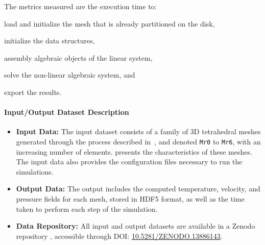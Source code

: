 The metrics measured are the execution time to:
\begin{inparaenum}[\it (i)]
    \item load and initialize the mesh that is already partitioned on the disk,
    \item initialize the data structures,
    \item assembly algebraic objects of the linear system,
    \item solve the non-linear algebraic system, and
    \item export the results.
\end{inparaenum}


\paragraph{Input/Output Dataset Description}

\begin{itemize}
    \item \textbf{Input Data:} The input dataset consists of a family of 3D tetrahedral meshes generated through the process described in~\cite{chabannes_3d_2024}, and denoted \texttt{Mr0} to \texttt{Mr6}, with an increasing number of elements.
     presents the characteristics of these meshes.
    The input data also provides the configuration files necessary to run the simulations.
    \item \textbf{Output Data:} The output includes the computed temperature, velocity, and pressure fields for each mesh, stored in HDF5 format, as well as the time taken to perform each step of the simulation.
    \item \textbf{Data Repository:} All input and output datasets are available in a Zenodo repository \cite{saigre_mesh_2024}, accessible through DOI: \href{https://doi.org/10.5281/ZENODO.13886143}{10.5281/ZENODO.13886143}.
\end{itemize}


